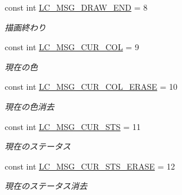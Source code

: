 \begin{DoxyCompactItemize}
\mbox{\label{class_reversi_form_1_1_reversi_const_ac62152472c76340dc99539bf761a4665}} 
const int \hyperlink{class_reversi_form_1_1_reversi_const_ac62152472c76340dc99539bf761a4665}{L\+C\+\_\+\+M\+S\+G\+\_\+\+D\+R\+A\+W\+\_\+\+E\+ND} = 8
\begin{DoxyCompactList}\small\item\em 描画終わり \end{DoxyCompactList}\item 
\mbox{\label{class_reversi_form_1_1_reversi_const_af3a7af4be07aba241f10512e0705e1a7}} 
const int \hyperlink{class_reversi_form_1_1_reversi_const_af3a7af4be07aba241f10512e0705e1a7}{L\+C\+\_\+\+M\+S\+G\+\_\+\+C\+U\+R\+\_\+\+C\+OL} = 9
\begin{DoxyCompactList}\small\item\em 現在の色 \end{DoxyCompactList}\item 
\mbox{\label{class_reversi_form_1_1_reversi_const_a5c979b0a3463fca6376a6be6430883ef}} 
const int \hyperlink{class_reversi_form_1_1_reversi_const_a5c979b0a3463fca6376a6be6430883ef}{L\+C\+\_\+\+M\+S\+G\+\_\+\+C\+U\+R\+\_\+\+C\+O\+L\+\_\+\+E\+R\+A\+SE} = 10
\begin{DoxyCompactList}\small\item\em 現在の色消去 \end{DoxyCompactList}\item 
\mbox{\label{class_reversi_form_1_1_reversi_const_a2d5f4f080a281d616e1bf3bceb880133}} 
const int \hyperlink{class_reversi_form_1_1_reversi_const_a2d5f4f080a281d616e1bf3bceb880133}{L\+C\+\_\+\+M\+S\+G\+\_\+\+C\+U\+R\+\_\+\+S\+TS} = 11
\begin{DoxyCompactList}\small\item\em 現在のステータス \end{DoxyCompactList}\item 
\mbox{\label{class_reversi_form_1_1_reversi_const_a30629f33f72a17186349f7712b74b540}} 
const int \hyperlink{class_reversi_form_1_1_reversi_const_a30629f33f72a17186349f7712b74b540}{L\+C\+\_\+\+M\+S\+G\+\_\+\+C\+U\+R\+\_\+\+S\+T\+S\+\_\+\+E\+R\+A\+SE} = 12
\begin{DoxyCompactList}\small\item\em 現在のステータス消去 \end{DoxyCompactList}\item 

\end{DoxyCompactItemize}
